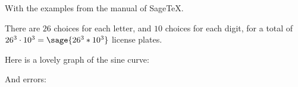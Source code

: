 \documentclass{article}
\begin{document}
With the examples from the manual of SageTeX.

There are $26$ choices for each letter, and $10$ choices for
each digit, for a total of  $26^3 \cdot 10^3 = \sage{26^3*10^3}$
license plates.

Here is a lovely graph of the sine curve:

And  errors:
\end{document}
